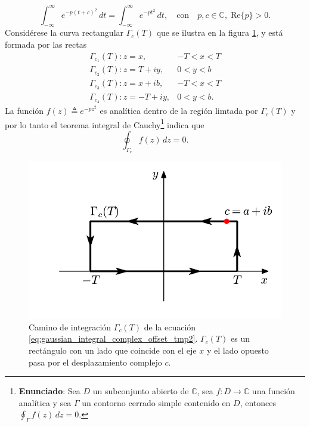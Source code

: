 \documentclass[a4paper]{report}
\begin{document}
\[
 \int_{-\infty}^{\infty}e^{-p(t+c)^2}\,dt = \int_{-\infty}^{\infty}e^{-pt^2}\,dt,\quad\textrm{con}\quad p,c\in\mathbb{C},\; \textrm{Re}\{p\}>0.
\]
Considérese la curva rectangular \(\Gamma_c(T)\) que se ilustra en la figura \ref{fig:gaussian_integral_complex_offset}, y está formada por las rectas  
\[
\begin{array}{lc}
\Gamma_{c_1}(T) : z=x,& -T<x<T \\
\Gamma_{c_2}(T) : z=T+iy,& 0<y<b \\ 
\Gamma_{c_3}(T) : z=x+ib,& -T<x<T \\
\Gamma_{c_4}(T) : z=-T+iy,& 0<y<b.
\end{array}
\]
La función \(f(z) \triangleq e^{-pz^2}\) es analítica dentro de la región limtada por \(\Gamma_c(T)\) y por lo tanto el teorema integral de Cauchy\footnote{\textbf{Enunciado}: Sea \(D\) un subconjunto abierto de \(\mathbb{C}\), sea \(f:D\rightarrow \mathbb{C}\) una función analítica y sea \(\Gamma\) un contorno cerrado simple contenido en \(D\), entonces \(\oint_\Gamma f(z)\,dz = 0\).} indica que
\begin{equation}\label{eq:gaussian_integral_complex_offset_tmp2}
 \oint_{\Gamma_c} f(z)\,dz = 0.
\end{equation}
\begin{figure}[!htb]
  \begin{minipage}[c]{0.5\textwidth}
    \includegraphics[width=\textwidth]{figuras/gaussian_integral_complex_offset.pdf}
  \end{minipage}\hfill
  \begin{minipage}[c]{0.47\textwidth}
    \caption{
       Camino de integración \(\Gamma_c(T)\) de la ecuación \ref{eq:gaussian_integral_complex_offset_tmp2}. \(\Gamma_c(T)\) es un rectángulo con un lado que coincide con el eje \(x\) y el lado opuesto pasa por el desplazamiento complejo \(c\).
    } \label{fig:gaussian_integral_complex_offset}
  \end{minipage}
\end{figure}
\end{document}
